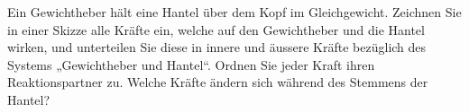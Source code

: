 Ein Gewichtheber hält eine Hantel über dem Kopf im Gleichgewicht. Zeichnen Sie in einer Skizze alle Kräfte ein, welche auf den Gewichtheber und die Hantel wirken, und unterteilen Sie diese in innere und äussere Kräfte bezüglich des Systems „Gewichtheber und Hantel“. Ordnen Sie jeder Kraft ihren Reaktionspartner zu. Welche Kräfte ändern sich während des Stemmens der Hantel?
